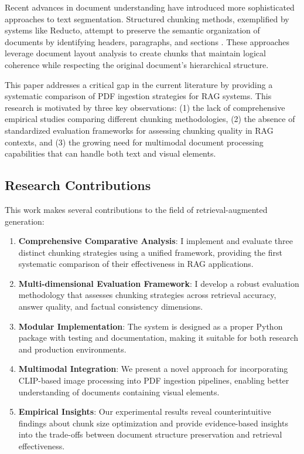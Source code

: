 \documentclass[11pt,a4paper]{article}
\begin{document}
Recent advances in document understanding have introduced more sophisticated approaches to text segmentation. Structured chunking methods, exemplified by systems like Reducto, attempt to preserve the semantic organization of documents by identifying headers, paragraphs, and sections \citep{reducto2024}. These approaches leverage document layout analysis to create chunks that maintain logical coherence while respecting the original document's hierarchical structure.

This paper addresses a critical gap in the current literature by providing a systematic comparison of PDF ingestion strategies for RAG systems. This research is motivated by three key observations: (1) the lack of comprehensive empirical studies comparing different chunking methodologies, (2) the absence of standardized evaluation frameworks for assessing chunking quality in RAG contexts, and (3) the growing need for multimodal document processing capabilities that can handle both text and visual elements.

\subsection{Research Contributions}

This work makes several contributions to the field of retrieval-augmented generation:

\begin{enumerate}
\item \textbf{Comprehensive Comparative Analysis}: I implement and evaluate three distinct chunking strategies using a unified framework, providing the first systematic comparison of their effectiveness in RAG applications.

\item \textbf{Multi-dimensional Evaluation Framework}: I develop a robust evaluation methodology that assesses chunking strategies across retrieval accuracy, answer quality, and factual consistency dimensions.

\item \textbf{Modular Implementation}: The system is designed as a proper Python package with testing and documentation, making it suitable for both research and production environments.

\item \textbf{Multimodal Integration}: We present a novel approach for incorporating CLIP-based image processing into PDF ingestion pipelines, enabling better understanding of documents containing visual elements.

\item \textbf{Empirical Insights}: Our experimental results reveal counterintuitive findings about chunk size optimization and provide evidence-based insights into the trade-offs between document structure preservation and retrieval effectiveness.
\end{enumerate}
\end{document}
